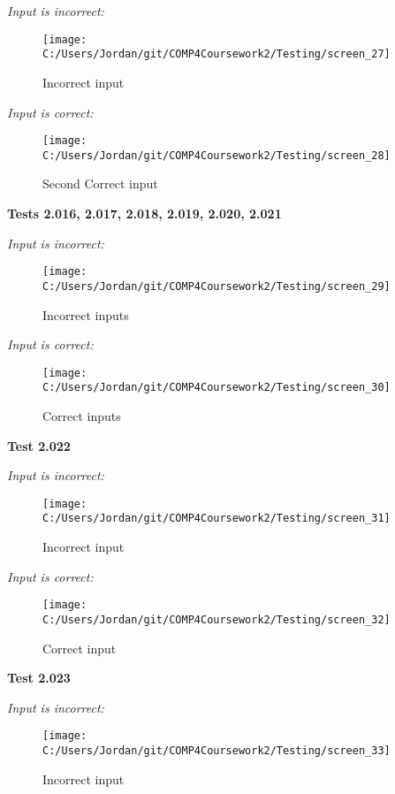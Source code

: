 \textit{Input is incorrect: }

\begin{figure}[H]
    \label{fig: Second Screen}\caption{Incorrect input}
    \texttt{[image: C:/Users/Jordan/git/COMP4Coursework2/Testing/screen\_27]}
\end{figure}

\textit{Input is correct: }

\begin{figure}[H]
    \label{fig: Second Screen}\caption{Second Correct input}
    \texttt{[image: C:/Users/Jordan/git/COMP4Coursework2/Testing/screen\_28]}
\end{figure}

\textbf{Tests 2.016, 2.017, 2.018, 2.019, 2.020, 2.021}

\textit{Input is incorrect: }

\begin{figure}[H]
    \label{fig: Second Screen}\caption{Incorrect inputs}
    \texttt{[image: C:/Users/Jordan/git/COMP4Coursework2/Testing/screen\_29]}
\end{figure}

\textit{Input is correct: }

\begin{figure}[H]
    \label{fig: Second Screen}\caption{Correct inputs}
    \texttt{[image: C:/Users/Jordan/git/COMP4Coursework2/Testing/screen\_30]}
\end{figure}

\textbf{Test 2.022}

\textit{Input is incorrect: }

\begin{figure}[H]
    \label{fig: Second Screen}\caption{Incorrect input}
    \texttt{[image: C:/Users/Jordan/git/COMP4Coursework2/Testing/screen\_31]}
\end{figure}

\textit{Input is correct: }

\begin{figure}[H]
    \label{fig: Second Screen}\caption{Correct input}
    \texttt{[image: C:/Users/Jordan/git/COMP4Coursework2/Testing/screen\_32]}
\end{figure}

\textbf{Test 2.023}

\textit{Input is incorrect: }

\begin{figure}[H]
    \label{fig: Second Screen}\caption{Incorrect input}
    \texttt{[image: C:/Users/Jordan/git/COMP4Coursework2/Testing/screen\_33]}
\end{figure}

